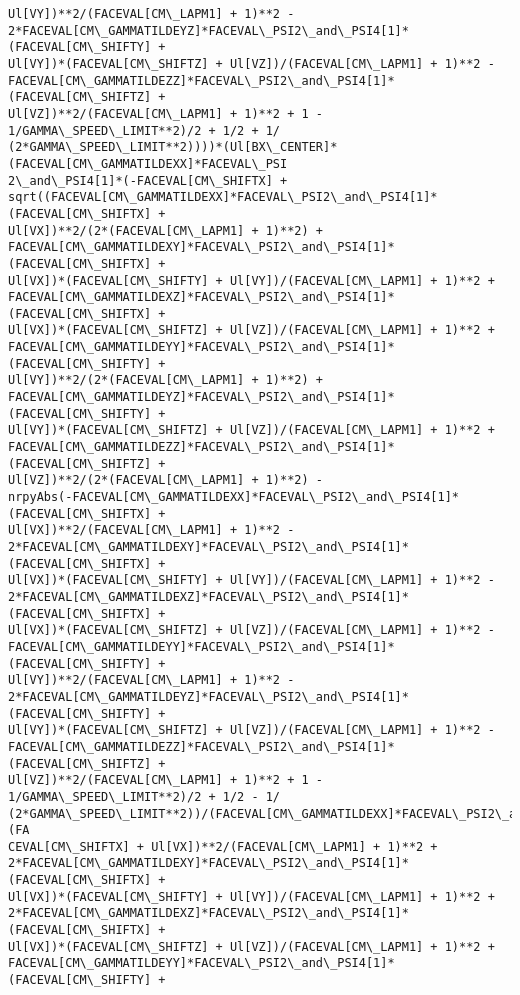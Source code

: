 \documentclass[landscape,letterpaper,10pt,english]{article}
\begin{document}
\begin{Verbatim}[commandchars=\\\{\}]
Ul[VY])**2/(FACEVAL[CM\_LAPM1] + 1)**2 -
2*FACEVAL[CM\_GAMMATILDEYZ]*FACEVAL\_PSI2\_and\_PSI4[1]*(FACEVAL[CM\_SHIFTY] +
Ul[VY])*(FACEVAL[CM\_SHIFTZ] + Ul[VZ])/(FACEVAL[CM\_LAPM1] + 1)**2 -
FACEVAL[CM\_GAMMATILDEZZ]*FACEVAL\_PSI2\_and\_PSI4[1]*(FACEVAL[CM\_SHIFTZ] +
Ul[VZ])**2/(FACEVAL[CM\_LAPM1] + 1)**2 + 1 - 1/GAMMA\_SPEED\_LIMIT**2)/2 + 1/2 + 1/
(2*GAMMA\_SPEED\_LIMIT**2))))*(Ul[BX\_CENTER]*(FACEVAL[CM\_GAMMATILDEXX]*FACEVAL\_PSI
2\_and\_PSI4[1]*(-FACEVAL[CM\_SHIFTX] +
sqrt((FACEVAL[CM\_GAMMATILDEXX]*FACEVAL\_PSI2\_and\_PSI4[1]*(FACEVAL[CM\_SHIFTX] +
Ul[VX])**2/(2*(FACEVAL[CM\_LAPM1] + 1)**2) +
FACEVAL[CM\_GAMMATILDEXY]*FACEVAL\_PSI2\_and\_PSI4[1]*(FACEVAL[CM\_SHIFTX] +
Ul[VX])*(FACEVAL[CM\_SHIFTY] + Ul[VY])/(FACEVAL[CM\_LAPM1] + 1)**2 +
FACEVAL[CM\_GAMMATILDEXZ]*FACEVAL\_PSI2\_and\_PSI4[1]*(FACEVAL[CM\_SHIFTX] +
Ul[VX])*(FACEVAL[CM\_SHIFTZ] + Ul[VZ])/(FACEVAL[CM\_LAPM1] + 1)**2 +
FACEVAL[CM\_GAMMATILDEYY]*FACEVAL\_PSI2\_and\_PSI4[1]*(FACEVAL[CM\_SHIFTY] +
Ul[VY])**2/(2*(FACEVAL[CM\_LAPM1] + 1)**2) +
FACEVAL[CM\_GAMMATILDEYZ]*FACEVAL\_PSI2\_and\_PSI4[1]*(FACEVAL[CM\_SHIFTY] +
Ul[VY])*(FACEVAL[CM\_SHIFTZ] + Ul[VZ])/(FACEVAL[CM\_LAPM1] + 1)**2 +
FACEVAL[CM\_GAMMATILDEZZ]*FACEVAL\_PSI2\_and\_PSI4[1]*(FACEVAL[CM\_SHIFTZ] +
Ul[VZ])**2/(2*(FACEVAL[CM\_LAPM1] + 1)**2) -
nrpyAbs(-FACEVAL[CM\_GAMMATILDEXX]*FACEVAL\_PSI2\_and\_PSI4[1]*(FACEVAL[CM\_SHIFTX] +
Ul[VX])**2/(FACEVAL[CM\_LAPM1] + 1)**2 -
2*FACEVAL[CM\_GAMMATILDEXY]*FACEVAL\_PSI2\_and\_PSI4[1]*(FACEVAL[CM\_SHIFTX] +
Ul[VX])*(FACEVAL[CM\_SHIFTY] + Ul[VY])/(FACEVAL[CM\_LAPM1] + 1)**2 -
2*FACEVAL[CM\_GAMMATILDEXZ]*FACEVAL\_PSI2\_and\_PSI4[1]*(FACEVAL[CM\_SHIFTX] +
Ul[VX])*(FACEVAL[CM\_SHIFTZ] + Ul[VZ])/(FACEVAL[CM\_LAPM1] + 1)**2 -
FACEVAL[CM\_GAMMATILDEYY]*FACEVAL\_PSI2\_and\_PSI4[1]*(FACEVAL[CM\_SHIFTY] +
Ul[VY])**2/(FACEVAL[CM\_LAPM1] + 1)**2 -
2*FACEVAL[CM\_GAMMATILDEYZ]*FACEVAL\_PSI2\_and\_PSI4[1]*(FACEVAL[CM\_SHIFTY] +
Ul[VY])*(FACEVAL[CM\_SHIFTZ] + Ul[VZ])/(FACEVAL[CM\_LAPM1] + 1)**2 -
FACEVAL[CM\_GAMMATILDEZZ]*FACEVAL\_PSI2\_and\_PSI4[1]*(FACEVAL[CM\_SHIFTZ] +
Ul[VZ])**2/(FACEVAL[CM\_LAPM1] + 1)**2 + 1 - 1/GAMMA\_SPEED\_LIMIT**2)/2 + 1/2 - 1/
(2*GAMMA\_SPEED\_LIMIT**2))/(FACEVAL[CM\_GAMMATILDEXX]*FACEVAL\_PSI2\_and\_PSI4[1]*(FA
CEVAL[CM\_SHIFTX] + Ul[VX])**2/(FACEVAL[CM\_LAPM1] + 1)**2 +
2*FACEVAL[CM\_GAMMATILDEXY]*FACEVAL\_PSI2\_and\_PSI4[1]*(FACEVAL[CM\_SHIFTX] +
Ul[VX])*(FACEVAL[CM\_SHIFTY] + Ul[VY])/(FACEVAL[CM\_LAPM1] + 1)**2 +
2*FACEVAL[CM\_GAMMATILDEXZ]*FACEVAL\_PSI2\_and\_PSI4[1]*(FACEVAL[CM\_SHIFTX] +
Ul[VX])*(FACEVAL[CM\_SHIFTZ] + Ul[VZ])/(FACEVAL[CM\_LAPM1] + 1)**2 +
FACEVAL[CM\_GAMMATILDEYY]*FACEVAL\_PSI2\_and\_PSI4[1]*(FACEVAL[CM\_SHIFTY] +

\end{Verbatim}
\end{document}

